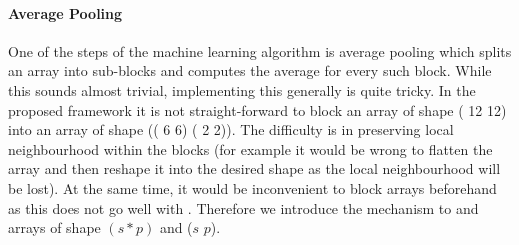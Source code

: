 \paragraph{Average Pooling}
One of the steps of the machine learning algorithm is average pooling which
splits an array into sub-blocks and computes the average for every such
block.  While this sounds almost trivial, implementing this generally is
quite tricky.  In the proposed framework it is
not straight-forward to block an array of shape ( 12   12)
into an array of shape  (( 6   6)  ( 2   2)).
The difficulty is in preserving local neighbourhood within the blocks (for example
it would be wrong to flatten the array and then reshape it into the desired shape
as the local neighbourhood will be lost).  At the same time, it would be inconvenient
to block arrays beforehand as this does not go well with .  Therefore
we introduce the mechanism to  and  arrays of shape $(s * p)$
and ($s$  $p$).

